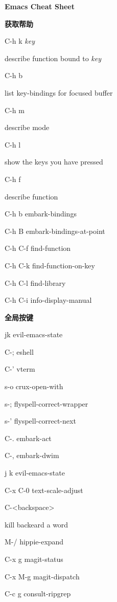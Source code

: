 \documentclass[10pt]{article}
\renewcommand\section[1]{\bigskip\par\textbf{\color{heading}\large#1}\smallskip}
\newcommand\humanreadable[1]{{\par\color{default}\small\sffamily#1}}
\newcommand\meta[1]{\textlangle\textit{#1}\textrangle}
\begin{document}
\begin{multicols}{3}

  \setlength{\columnsep}{1cm}
  \begin{center}
    \LARGE\color{heading}\textbf{Emacs Cheat Sheet}
  \end{center}

  \section{获取帮助}
  \begin{keylist}
  \item[C-h k \meta{key}] \humanreadable{describe function bound to \meta{key}}
  \item[C-h b] \humanreadable{list key-bindings for focused buffer}
  \item[C-h m] \humanreadable{describe mode}
  \item[C-h l] \humanreadable{show the keys you have pressed}
  \item[C-h f] \humanreadable{describe function}
  \item[C-h b] embark-bindings
  \item[C-h B] embark-bindings-at-point
  \item[C-h C-f] find-function
  \item[C-h C-k] find-function-on-key
  \item[C-h C-l] find-library
  \item[C-h C-i] info-display-manual
  \end{keylist}

  \section{全局按键}
  \begin{keylist}
  \item[jk] evil-emacs-state
  \item[C-;] eshell
  \item[C-'] vterm
  \item[s-o] crux-open-with
  \item[s-;] flyspell-correct-wrapper
  \item[s-'] flyspell-correct-next
  \item[C-.] embark-act
  \item[C-,] embark-dwim
  \item[j k] evil-emacs-state
  \item[C-x C-0] text-scale-adjust
  \item[C-<backspace>] \humanreadable{kill backeard a word}
  \item[M-/] hippie-expand
  \item[C-x g] magit-status
  \item[C-x M-g] magit-dispatch
  \item[C-c g] consult-ripgrep
  \end{keylist}


\end{multicols}
\end{document}
